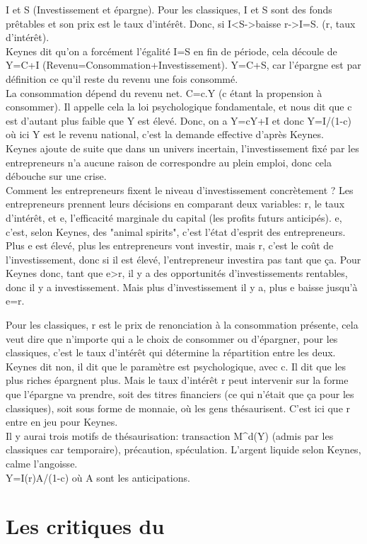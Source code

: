 \documentclass[10pt, a4paper, openany]{book}
\begin{document}
I et S (Investissement et épargne). Pour les classiques, I et S sont des fonds prêtables et son prix est le taux d'intérêt. Donc, si I<S->baisse r->I=S. (r, taux d'intérêt). \\
Keynes dit qu'on a forcément l'égalité I=S en fin de période, cela découle de Y=C+I (Revenu=Consommation+Investissement). Y=C+S, car l'épargne est par définition ce qu'il reste du revenu une fois consommé. \\
La consommation dépend du revenu net. C=c.Y (c étant la propension à consommer). Il appelle cela la loi psychologique fondamentale, et nous dit que c est d'autant plus faible que Y est élevé. Donc, on a Y=cY+I et donc Y=I/(1-c) où ici Y est le revenu national, c'est la demande effective d'après Keynes. \\
Keynes ajoute de suite que dans un univers incertain, l'investissement fixé par les entrepreneurs n'a aucune raison de correspondre au plein emploi, donc cela débouche sur une crise. \\
Comment les entrepreneurs fixent le niveau d'investissement concrètement ? Les entrepreneurs prennent leurs décisions en comparant deux variables: r, le taux d'intérêt, et e, l'efficacité marginale du capital (les profits futurs anticipés).  e, c'est, selon Keynes, des "animal spirits", c'est l'état d'esprit des entrepreneurs. Plus e est élevé, plus les entrepreneurs vont investir, mais r, c'est le coût de l'investissement, donc si il est élevé, l'entrepreneur investira pas tant que ça. Pour Keynes donc, tant que e>r, il y a des opportunités d'investissements rentables, donc il y a investissement. Mais plus d'investissement il y a, plus e baisse jusqu'à e=r.


Pour les classiques, r est le prix de renonciation à la consommation présente, cela veut dire que n'importe qui a le choix de consommer ou d'épargner, pour les classiques, c'est le taux d'intérêt qui détermine la répartition entre les deux. \\
Keynes dit non, il dit que le paramètre est psychologique, avec c. Il dit que les plus riches épargnent plus. Mais le taux d'intérêt r peut intervenir sur la forme que l'épargne va prendre, soit des titres financiers (ce qui n'était que ça pour les classiques), soit sous forme de monnaie, où les gens thésaurisent. C'est ici que r entre en jeu pour Keynes. \\
Il y aurai trois motifs de thésaurisation: transaction M^d(Y) (admis par les classiques car temporaire), précaution, spéculation. L'argent liquide selon Keynes, calme l'angoisse. \\
Y=I(r)A/(1-c) où A sont les anticipations. 










\section{Les critiques du }
\end{document}
